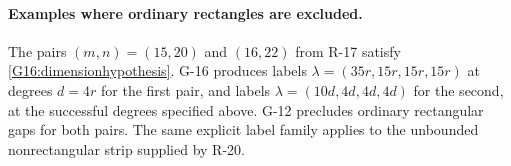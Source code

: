 \paragraph{Examples where ordinary rectangles are excluded.}
The pairs $(m,n)=(15,20)$ and $(16,22)$ from R-17 satisfy
\eqref{G16:dimensionhypothesis}. G-16 produces labels
$\lambda=(35r,15r,15r,15r)$ at degrees $d=4r$ for the first pair,
and labels $\lambda=(10d,4d,4d,4d)$ for the second, at the
successful degrees specified above. G-12 precludes ordinary
rectangular gaps for both pairs. The same explicit label family
applies to the unbounded nonrectangular strip supplied by R-20.

